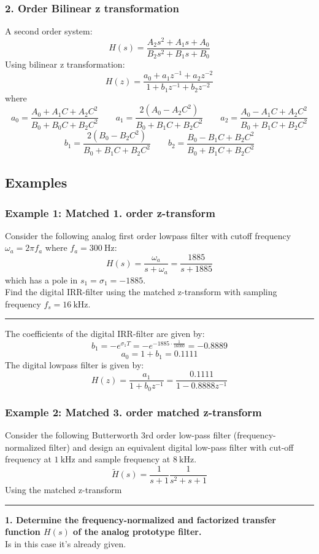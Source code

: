 \subsubsection{2. Order Bilinear z transformation}
A second order system:
$$H(s)={\frac{A_{2}s^{2}+A_{1}s+A_{0}}{B_{2}s^{2}+B_{1}s+B_{0}}}$$
Using bilinear z transformation:
$$H(z)={\frac{a_{0}+a_{1}z^{-1}+a_{2}z^{-2}}{1+b_{1}z^{-1}+b_{2}z^{-2}}}$$
where
$$a_{0}=\frac{A_{0}+A_{1}C+A_{2}C^{2}}{B_{0}+B_{0}C+B_{2}C^{2}}\qquad a_{1}=\frac{2(A_{0}-A_{2}C^{2})}{B_{0}+B_{1}C+B_{2}C^{2}}\qquad a_{2}=\frac{A_{0}-A_{1}C+A_{2}C^{2}}{B_{0}+B_{1}C+B_{2}C^{2}}$$
$$b_{1}=\frac{2(B_{0}-B_{2}C^{2})}{B_{0}+B_{1}C+B_{2}C^{2}}\qquad b_{2}=\frac{B_{0}-B_{1}C+B_{2}C^{2}}{B_{0}+B_{1}C+B_{2}C^{2}}$$
\subsection{Examples}
\subsubsection{Example 1: Matched 1. order z-transform}
Consider the following analog first order lowpass filter with cutoff frequency $\omega_a=2\pi f_a$ where $f_a=\SI{300}{\hertz}$:
$$H(s)=\frac{\omega_a}{s+\omega_a}=\frac{1885}{s+1885}$$
which has a pole in $s_1=\sigma_1=-1885$.\\
Find the digital IRR-filter using the matched z-transform with sampling frequency $f_s=\SI{16}{\kilo\hertz}$.

\rule{\textwidth}{0.5pt}

The coefficients of the digital IRR-filter are given by:
$$b_1=-e^{\sigma_1 T}=-e^{-1885\cdot\frac{1}{16000}}=-0.8889$$
$$a_0=1+b_1=0.1111$$
The digital lowpass filter is given by:
$$H(z)=\frac{a_1}{1+b_0z^{-1}}=\frac{0.1111}{1-0.8888z^{-1}}$$

\subsubsection{Example 2: Matched 3. order matched z-transform}
Consider the following Butterworth 3rd order low-pass filter (frequency-normalized filter) 
and design an equivalent digital low-pass filter with cut-off frequency at $\SI{1}{\kilo\hertz}$ and sample frequency at $\SI{8}{\kilo\hertz}$. 
$${\tilde{H}}(s)=\frac{1}{s+1}\frac{1}{s^{2}+s+1}$$
Using the matched z-transform

\rule{\textwidth}{0.5pt}

\textbf{1. Determine the frequency-normalized and factorized transfer function $H(s)$ of the analog prototype filter.}\\
Is in this case it's already given.

